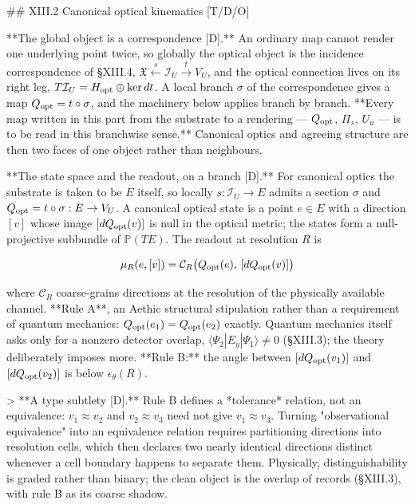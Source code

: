 ## XIII.2 Canonical optical kinematics [T/D/O]

**The global object is a correspondence [D].** An ordinary map cannot render one underlying point twice, so globally the optical object is the incidence correspondence of §XIII.4, $\mathfrak X\xleftarrow{s}\mathcal I_U\xrightarrow{t}V_U$, and the optical connection lives on its right leg, $T\mathcal I_U = H_{\rm opt}\oplus\ker dt$. A local branch $\sigma$ of the correspondence gives a map $Q_{\rm opt} = t\circ\sigma$, and the machinery below applies branch by branch. **Every map written in this part from the substrate to a rendering — $Q_{\rm opt}$, $\Pi_s$, $U_u$ — is to be read in this branchwise sense.** Canonical optics and agreeing structure are then two faces of one object rather than neighbours.

**The state space and the readout, on a branch [D].** For canonical optics the substrate is taken to be $E$ itself, so locally $s:\mathcal I_U\to E$ admits a section $\sigma$ and $Q_{\rm opt} = t\circ\sigma:E\to V_U$. A canonical optical state is a point $e\in E$ with a direction $[v]$ whose image $[dQ_{\rm opt}(v)]$ is null in the optical metric; the states form a null-projective subbundle of $\mathbb{P}(TE)$. The readout at resolution $R$ is

$$\mu_R(e,[v]) = \mathcal C_R\big(Q_{\rm opt}(e),\,[dQ_{\rm opt}(v)]\big)$$

where $\mathcal C_R$ coarse-grains directions at the resolution of the physically available channel. **Rule A**, an Aethic structural stipulation rather than a requirement of quantum mechanics: $Q_{\rm opt}(e_1) = Q_{\rm opt}(e_2)$ exactly. Quantum mechanics itself asks only for a nonzero detector overlap, $\langle\Psi_2|E_y|\Psi_1\rangle\neq0$ (§XIII.3); the theory deliberately imposes more. **Rule B:** the angle between $[dQ_{\rm opt}(v_1)]$ and $[dQ_{\rm opt}(v_2)]$ is below $\epsilon_\theta(R)$.

> **A type subtlety [D].** Rule B defines a *tolerance* relation, not an equivalence: $v_1\approx v_2$ and $v_2\approx v_3$ need not give $v_1\approx v_3$. Turning "observational equivalence" into an equivalence relation requires partitioning directions into resolution cells, which then declares two nearly identical directions distinct whenever a cell boundary happens to separate them. Physically, distinguishability is graded rather than binary; the clean object is the overlap of records (§XIII.3), with rule B as its coarse shadow.


